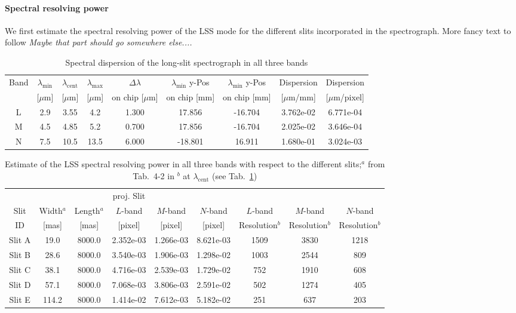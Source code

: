 \paragraph{Spectral resolving power}
We first estimate the spectral resolving power of the \ac{LSS} mode for the different slits incorporated in the spectrograph. More fancy text to follow \textit{Maybe that part should go somewhere else....}\cite{METIS-system_analysis}
\begin{table}
\begin{center}
\begin{tabular}{c|cccc|cc|cc}
Band & $\lambda_\textrm{min}$ & $\lambda_\textrm{cent}$ & $\lambda_\textrm{max}$ & $\Delta\lambda$  & $\lambda_\textrm{min}$ y-Pos & $\lambda_\textrm{min}$ y-Pos & Dispersion & Dispersion \\
 & [$\mu$m] & [$\mu$m] & [$\mu$m]& on chip [$\mu$m] & on chip [mm] & on chip [mm] & [$\mu$m/mm] & [$\mu$m/pixel]\\
\hline
L & 2.9 & 3.55 & 4.2 & 1.300 & 17.856 & -16.704 & 3.762e-02 & 6.771e-04 \\
M & 4.5 & 4.85 & 5.2 & 0.700 & 17.856 & -16.704 & 2.025e-02 & 3.646e-04 \\
N & 7.5 & 10.5 & 13.5 & 6.000 & -18.801 & 16.911 & 1.680e-01 & 3.024e-03 \\
\end{tabular}
\caption{Spectral dispersion of the long-slit spectrograph in all three bands\label{tab:bands_specres1}}
\end{center}
\end{table}

\begin{table}
\begin{center}
\begin{tabular}{c|cc|ccc|ccc}
 & & & proj. Slit & & & & & \\
Slit & Width$^a$ & Length$^a$ & $L$-band & $M$-band & $N$-band & $L$-band & $M$-band & $N$-band \\
ID & [mas] & [mas] & [pixel] & [pixel] & [pixel] & Resolution$^b$ & Resolution$^b$ & Resolution$^b$ \\
\hline
Slit A & 19.0 & 8000.0 & 2.352e-03 & 1.266e-03 & 8.621e-03 & 1509 & 3830 & 1218 \\
Slit B & 28.6 & 8000.0 & 3.540e-03 & 1.906e-03 & 1.298e-02 & 1003 & 2544 & 809 \\
Slit C & 38.1 & 8000.0 & 4.716e-03 & 2.539e-03 & 1.729e-02 & 752 & 1910 & 608 \\
Slit D & 57.1 & 8000.0 & 7.068e-03 & 3.806e-03 & 2.591e-02 & 502 & 1274 & 405 \\
Slit E & 114.2 & 8000.0 & 1.414e-02 & 7.612e-03 & 5.182e-02 & 251 & 637 & 203 \\
\end{tabular}
\caption{Estimate of the LSS spectral resolving power in all three bands with respect to the different slits;\newline $^a$ from Tab.~4-2 in \cite{METIS-system_analysis} \newline $^b$ at $\lambda_\textrm{cent}$ (see Tab.~\ref{tab:bands_specres1})\label{tab:bands_specres2}}
\end{center}
\end{table}


